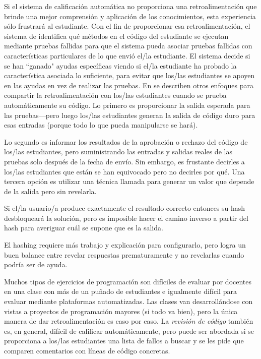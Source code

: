 Si el sistema de calificación automática no proporciona una retroalimentación que brinde una mejor comprensión y aplicación de los conocimientos, esta experiencia sólo frustrará al estudiante.
Con el fin de proporcionar esa retroalimentación, 
el sistema de \cite{Buff2015} identifica qué métodos en el código del estudiante  se ejecutan mediante pruebas fallidas 
para que el sistema pueda asociar pruebas fallidas con características particulares de lo que envió el/la estudiante.
El sistema decide si se han ``ganado" ayudas específicas viendo si el/la estudiante ha probado la característica asociada lo suficiente, para evitar que los/las estudiantes se apoyen en las ayudas en vez de realizar las pruebas.
En \cite{Srid2016} se describen otros enfoques para compartir la retroalimentación con los/las estudiantes 
cuando se prueba automáticamente su código.
Lo primero es proporcionar la salida esperada para las pruebas---pero 
luego los/las estudiantes generan la salida de código duro para esas entradas 
(porque todo lo que pueda manipularse se hará).

Lo segundo es informar  los resultados de la aprobación o rechazo del código de los/las estudiantes, 
pero suministrando las entradas y salidas reales de las pruebas solo después de la fecha de envío.
Sin embargo, 
es frustante decirles a los/las estudiantes que están se han equivocado pero no decirles por qué.
Una tercera opción es utilizar una técnica llamada  para generar un valor que depende de la salida pero sin revelarla.

Si el/la usuario/a produce exactamente el resultado correcto
entonces su hash desbloqueará la solución, 
pero es imposible hacer el camino inverso a partir del hash para averiguar cuál se supone que es la salida.

El hashing requiere más trabajo y explicación para configurarlo, 
pero logra un buen balance entre revelar respuestas prematuramente  y no revelarlas cuando podría ser de ayuda.


Muchos tipos de ejercicios de programación son difíciles de evaluar por docentes en una clase con más de un puñado de estudiantes e igualmente difícil para evaluar mediante plataformas automatizadas.
Las clases van desarrollándose con vistas a proyectos de programación mayores (si todo va bien), 
pero la única manera de dar retroalimentación es caso por caso.
La \emph{revisión de código} también es, en general, difícil de calificar automáticamente,
pero puede ser abordada si se proporciona a  los/las estudiantes una lista de fallos a buscar y se les pide que comparen comentarios con líneas de código concretas.


